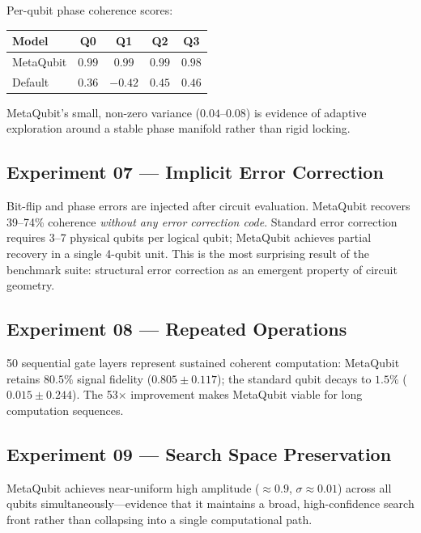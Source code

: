 \documentclass[twocolumn,amsmath,amssymb,prl]{revtex4-2}
\begin{document}
Per-qubit phase coherence scores:

\begin{center}
\begin{tabular}{lcccc}
\toprule
Model & Q0 & Q1 & Q2 & Q3 \\
\midrule
MetaQubit & $0.99$ & $0.99$ & $0.99$ & $0.98$ \\
Default   & $0.36$ & $-0.42$ & $0.45$ & $0.46$ \\
\bottomrule
\end{tabular}
\end{center}

MetaQubit's small, non-zero variance ($0.04$--$0.08$) is evidence of adaptive
exploration around a stable phase manifold rather than rigid locking.

\subsection{Experiment 07 — Implicit Error Correction}

Bit-flip and phase errors are injected after circuit evaluation.  MetaQubit
recovers 39--74\% coherence \emph{without any error correction code}.  Standard
error correction requires 3--7 physical qubits per logical qubit; MetaQubit
achieves partial recovery in a single 4-qubit unit.  This is the most
surprising result of the benchmark suite: structural error correction as an
emergent property of circuit geometry.

\subsection{Experiment 08 — Repeated Operations}

50 sequential gate layers represent sustained coherent computation:
MetaQubit retains $80.5\%$ signal fidelity ($0.805 \pm 0.117$); the standard
qubit decays to $1.5\%$ ($0.015 \pm 0.244$).  The 53$\times$ improvement
makes MetaQubit viable for long computation sequences.

\subsection{Experiment 09 — Search Space Preservation}

MetaQubit achieves near-uniform high amplitude ($\approx 0.9$, $\sigma
\approx 0.01$) across all qubits simultaneously—evidence that it maintains a
broad, high-confidence search front rather than collapsing into a single
computational path.
\end{document}
